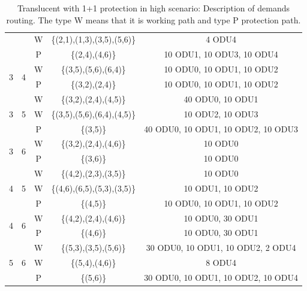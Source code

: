 \begin{table}[h]
\begin{tabular}{||c|c|c|c|c||}
  & &W& \{(2,1),(1,3),(3,5),(5,6)\} & 4 ODU4 \\
  & &P& \{(2,4),(4,6)\} & 10 ODU1, 10 ODU3, 10 ODU4 \\ \hline
 \multirow{2}{*}{3} & \multirow{2}{*}{4}&W& \{(3,5),(5,6),(6,4)\} & 10 ODU0, 10 ODU1, 10 ODU2 \\
  & &P& \{(3,2),(2,4)\} & 10 ODU0, 10 ODU1, 10 ODU2 \\ \hline
 \multirow{3}{*}{3}&\multirow{3}{*}{5}&W&\{(3,2),(2,4),(4,5)\}&40 ODU0, 10 ODU1 \\
  & &W& \{(3,5),(5,6),(6,4),(4,5)\}& 10 ODU2, 10 ODU3\\
  & &P& \{(3,5)\} & 40 ODU0, 10 ODU1, 10 ODU2, 10 ODU3 \\ \hline
 \multirow{2}{*}{3} & \multirow{2}{*}{6}&W& \{(3,2),(2,4),(4,6)\} & 10 ODU0 \\
  & &P& \{(3,6)\} & 10 ODU0 \\ \hline
 \multirow{3}{*}{4} & \multirow{3}{*}{5}&W& \{(4,2),(2,3),(3,5)\} & 10 ODU0 \\
  & &W& \{(4,6),(6,5),(5,3),(3,5)\} & 10 ODU1, 10 ODU2 \\
  & &P& \{(4,5)\} & 10 ODU0, 10 ODU1, 10 ODU2 \\ \hline
 \multirow{2}{*}{4} & \multirow{2}{*}{6}&W& \{(4,2),(2,4),(4,6)\} & 10 ODU0, 30 ODU1\\
  & &P& \{(4,6)\} & 10 ODU0, 30 ODU1\\ \hline
 \multirow{3}{*}{5} & \multirow{3}{*}{6}&W&\{(5,3),(3,5),(5,6)\}& 30 ODU0, 10 ODU1, 10 ODU2, 2 ODU4 \\
  & &W& \{(5,4),(4,6)\} & 8 ODU4 \\
  & &P& \{(5,6)\}& 30 ODU0, 10 ODU1, 10 ODU2, 10 ODU4 \\ \hline
\end{tabular}
\caption{Translucent with 1+1 protection in high scenario: Description of demands routing. The type W means that it is working path and type P protection path.}
\label{path_transluc_protec_ref_high}
\end{table}
\newpage
